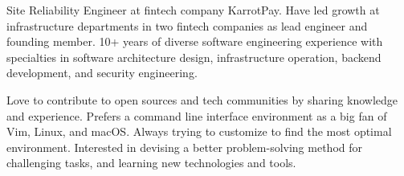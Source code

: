 

\begin{cvparagraph}

Site Reliability Engineer at fintech company KarrotPay. Have led growth at infrastructure departments in two fintech companies as lead engineer and founding member. 10+ years of diverse software engineering experience with specialties in software architecture design, infrastructure operation, backend development, and security engineering.

Love to contribute to open sources and tech communities by sharing knowledge and experience. Prefers a command line interface environment as a big fan of Vim, Linux, and macOS. Always trying to customize to find the most optimal environment. Interested in devising a better problem-solving method for challenging tasks, and learning new technologies and tools.
\end{cvparagraph}

